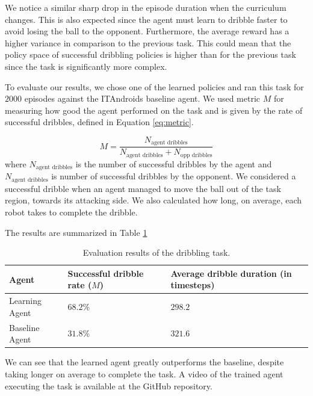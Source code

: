 We notice a similar sharp drop in the episode duration when the curriculum changes. This is also
expected since the agent must learn to dribble faster to avoid losing the ball to the opponent.
Furthermore, the average reward has a higher variance in comparison to the previous task.
This could mean that the policy space of successful dribbling policies is higher than for the
previous task since the task is significantly more complex.


To evaluate our results, we chose one of the learned policies and ran this task for $2000$ episodes
against the ITAndroids baseline agent.
We used metric $M$ for measuring how good the agent performed on the task and is given by the rate of successful dribbles,
defined in Equation \ref{eq:metric}.

\begin{equation}
	M = \dfrac{N_{\text{agent dribbles}}}{N_{\text{agent dribbles}} + N_{\text{opp dribbles}}}
	\label{eq:metric}
\end{equation}
where $N_{\text{agent dribbles}}$ is the number of successful dribbles by the agent and
$N_{\text{agent dribbles}}$ is number of successful dribbles by the opponent.
We considered a successful dribble when an agent managed to move the ball
out of the task region, towards its attacking side.
We also calculated how long, on average, each robot takes to complete the dribble.

The results are summarized in Table \ref{tab:dribble}

\begin{table}[ht]
    \begin{tabular}{|l|l|l|}
    \hline
    Agent            &Successful dribble rate ($M$)   & Average dribble duration (in timesteps) \\ \hline
    Learning Agent   &$ 68.2$\%                       & $298.2$               \\
    Baseline Agent   &$ 31.8$\%                       & $321.6$                \\ \hline
    \end{tabular}
\centering
\caption{Evaluation results of the dribbling task.}
\label{tab:dribble}
\end{table}

We can see that the learned agent greatly outperforms the baseline, despite taking longer on average
to complete the task.
A video of the trained agent executing the task is available at the GitHub repository.
